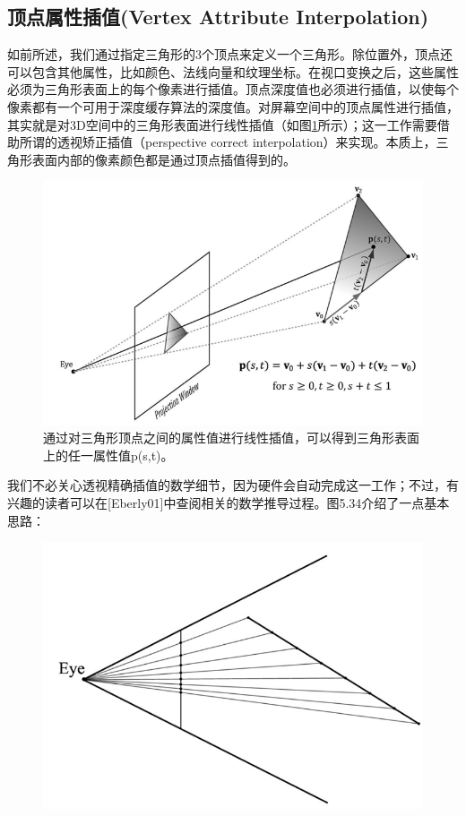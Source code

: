 \documentclass[11pt,a4paper,oldfontcommands]{memoir}
\begin{document}
{\subsection{顶点属性插值(Vertex Attribute Interpolation)}
\begin{flushleft}
如前所述，我们通过指定三角形的3个顶点来定义一个三角形。除位置外，顶点还可以包含其他属性，比如颜色、法线向量和纹理坐标。在视口变换之后，这些属性必须为三角形表面上的每个像素进行插值。顶点深度值也必须进行插值，以使每个像素都有一个可用于深度缓存算法的深度值。对屏幕空间中的顶点属性进行插值，其实就是对3D空间中的三角形表面进行线性插值（如图\ref{fig:5-33}所示）；这一工作需要借助所谓的透视矫正插值（perspective
correct interpolation）来实现。本质上，三角形表面内部的像素颜色都是通过顶点插值得到的。
\end{flushleft}
\begin{figure}[h]
    \includegraphics[width=\textwidth]{5-33}
    \centering
    \caption{通过对三角形顶点之间的属性值进行线性插值，可以得到三角形表面上的任一属性值p(s,t)。}
    \label{fig:5-33}
\end{figure}
\begin{flushleft}
我们不必关心透视精确插值的数学细节，因为硬件会自动完成这一工作；不过，有兴趣的读者可以在[Eberly01]中查阅相关的数学推导过程。图5.34介绍了一点基本思路：
\end{flushleft}
\begin{figure}[h]
    \includegraphics[width=\textwidth]{5-34}

\end{figure}}
\end{document}
